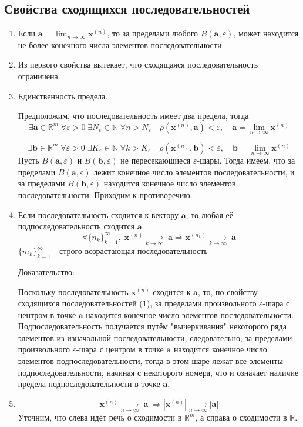 \subsection{Свойства сходящихся последовательностей}
\begin{enumerate} 
  \item 
  Если $\textbf {a} = \lim_{n\to\infty}{\textbf{x}^{(n)}}$, то за пределами любого $B(\textbf {a}, \varepsilon)$, может находится не более конечного числа элементов последовательности.
  \item
  Из первого свойства вытекает, что сходящаяся последовательность ограничена.
  \item
  Единственность предела.
  
  Предположим, что последовательность имеет два предела, тогда 
$$
\exists \textbf {a} \in \mathbb {R}^m \; \forall \varepsilon > 0 \; \exists N_{\varepsilon} \in \mathbb {N} \; \forall n > N_{\varepsilon} \quad \rho(\textbf{x}^{(n)}, \textbf {a}) < {\varepsilon}, \quad \textbf {a} = \lim_{n\to\infty}{\textbf{x}^{(n)}}
$$

$$
\exists \textbf {b} \in \mathbb {R}^m \; \forall \varepsilon > 0 \; \exists K_{\varepsilon} \in \mathbb {N} \; \forall k > K_{\varepsilon} \quad \rho(\textbf{x}^{(n)}, \textbf {b}) < {\varepsilon}, \quad \textbf {b} = \lim_{n\to\infty}{\textbf{x}^{(n)}}
$$
Пусть $B(\textbf {a}, \varepsilon)$ и $B(\textbf {b}, \varepsilon)$ не пересекающиеся $\varepsilon$-шары. Тогда имеем, что за пределами $B(\textbf {a}, \varepsilon)$ лежит конечное число элементов последовательности, и за пределами $B(\textbf {b}, \varepsilon)$ находится конечное число элементов последовательности. Приходим к противоречию.
  \item
  Если последовательность сходится к вектору $\textbf {a}$, то любая её подпоследовательность сходится $\textbf {a}$.
  $$
  \forall \{n_k\}^{\infty}_{k=1}, \;\textbf {x}^{(n)} \underset{k \to \infty}{\longrightarrow} \; \textbf {a} \Rightarrow \textbf {x}^{(n_k)} \underset{k \to \infty}{\longrightarrow} \; \textbf {a}
  $$
  $\{m_k\}^{\infty}_{k=1}$ - строго возрастающая последовательность 
  
  Доказательство:
  
  Поскольку последовательность $\textbf {x}^{(n)}$ сходится к $\textbf {a}$, то, по свойству сходящихся последовательностей (1), за пределами произвольного $\varepsilon$-шара с центром в точке $\textbf {a}$ находится конечное число элементов последовательности. Подпоследовательность получается путём "вычеркивания" некоторого ряда элементов из изначальной последовательности, следовательно, за пределами произвольного $\varepsilon$-шара с центром в точке $\textbf {a}$ находится конечное число элементов подпоследовательности, тогда в этом шаре лежат все элементы подпоследовательности, начиная с некоторого номера, что и означает наличие предела подпоследовательности в точке $\textbf {a}$.
  \item
  $$
  \textbf {x}^{(n)} \underset{n \to \infty}{\longrightarrow} \; \textbf {a} \; \Rightarrow |\textbf {x}^{(n)}| \underset{n \to \infty}{\longrightarrow} |\textbf {a}|
  $$
  Уточним, что слева идёт речь о сходимости в $\mathbb {R}^m$, а справа о сходимости в $\mathbb {R}$.
  

\end{enumerate}
